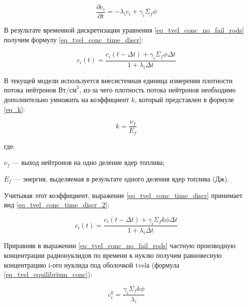 \begin{equation}
    \label{eq_tvel_conc_no_fail_rods}
    \frac{\partial c_{i}}{\partial t} = -\lambda_{i}c_{i} + \gamma_{i}\Sigma_{f}\phi
\end{equation}

В результате временной дискретизации уравнения \ref{eq_tvel_conc_no_fail_rods} получим формулу \ref{eq_tvel_conc_time_discr}:

\begin{equation}
    \label{eq_tvel_conc_time_discr}
    c_{i}(t) = \frac{c_{i}(t - \Delta t) + \gamma_{i} \Sigma_{f} \phi \Delta t}{1 + \lambda_{i} \Delta t}
\end{equation}

В текущей модели используется внесистемная единица измерения плотности потока нейтронов $\text{Вт/см}^{2}$, из-за чего 
плотность потока нейтронов необходимо дополнительно умножить на коэффициент $k$, который представлен в формуле 
\ref{eq_k}:

\begin{equation}
    \label{eq_k}
    k = \frac{\nu_{f}}{E_{f}}
\end{equation}

где:
\begin{description}
    \item $\nu_{f}$ --- выход нейтронов на одно деление ядер топлива;
    \item $E_{f}$ --- энергия, выделяемая в результате одного деления ядер топлива (Дж).
\end{description}

Учитывая этот коэффициент, выражение \ref{eq_tvel_conc_time_discr} принимает вид \ref{eq_tvel_conc_time_discr_2}:

\begin{equation}
    \label{eq_tvel_conc_time_discr_2}
    c_{i}(t) = \frac{c_{i}(t - \Delta t) + \gamma_{i} \Sigma_{f} k \phi \Delta t}{1 + \lambda_{i} \Delta t}
\end{equation}

Приравняв в выражении \ref{eq_tvel_conc_no_fail_rods} частную производную концентрации радионуклидов по времени к 
нуклю получим равновесную концентрацию i-ого нуклида под оболочкой \ac{tvel}а (формула \ref{eq_tvel_equilibrium_conc}):

\begin{equation}
    \label{eq_tvel_equilibrium_conc}
    c_{i}^{0} = \frac{\gamma_{i} \Sigma_{f} k \phi}{\lambda_{i}} 
\end{equation}

